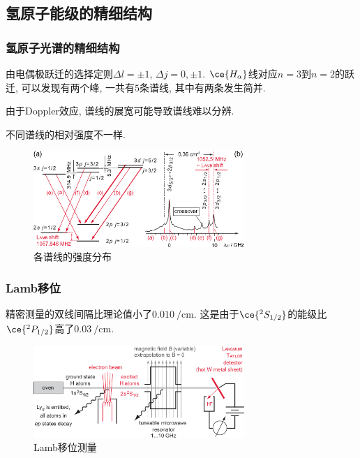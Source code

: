 \documentclass[hidelinks]{ctexart}
\begin{document}


\subsection{氢原子能级的精细结构} %
\label{sub:氢原子能级的精细结构}

\subsubsection{氢原子光谱的精细结构} %
\label{ssub:氢原子光谱的精细结构}

\begin{figure}[ht]
    \centering
\end{figure}
由电偶极跃迁的选择定则$\Delta l = \pm 1$, $\Delta j = 0, \pm 1$. $\ce{H_\alpha}$线对应$n=3$到$n=2$的跃迁, 可以发现有两个峰, 一共有$5$条谱线, 其中有两条发生简并.
\begin{remark}
    由于Doppler效应, 谱线的展宽可能导致谱线难以分辨.
\end{remark}
\begin{remark}
    不同谱线的相对强度不一样.
\end{remark}
\begin{figure}[ht]
    \centering
    \includegraphics[width=8cm]{src/FineStHyd.png}
    \caption{各谱线的强度分布}
\end{figure}


\subsubsection{Lamb移位} %
\label{ssub:lamb移位}

精密测量的双线间隔比理论值小了$\SI{0.010}{\per\centi\meter}$. 这是由于$\ce{^2S_{1/2}}$的能级比$\ce{^2P_{1/2}}$高了$\SI{0.03}{\per\centi\meter}$.

\begin{figure}[ht]
    \centering
    \includegraphics[width=8cm]{src/LambApp.png}
    \caption{Lamb移位测量}
\end{figure}
\end{document}
